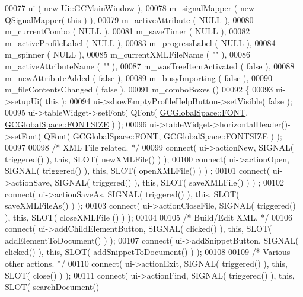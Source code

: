 \begin{DoxyCode}
00077   ui                        ( new Ui::\hyperlink{class_g_c_main_window}{GCMainWindow} ),
00078   m\_signalMapper            ( new QSignalMapper( this ) ),
00079   m\_activeAttribute         ( NULL ),
00080   m\_currentCombo            ( NULL ),
00081   m\_saveTimer               ( NULL ),
00082   m\_activeProfileLabel      ( NULL ),
00083   m\_progressLabel           ( NULL ),
00084   m\_spinner                 ( NULL ),
00085   m\_currentXMLFileName      ( \textcolor{stringliteral}{""} ),
00086   m\_activeAttributeName     ( \textcolor{stringliteral}{""} ),
00087   m\_wasTreeItemActivated    ( false ),
00088   m\_newAttributeAdded       ( false ),
00089   m\_busyImporting           ( false ),
00090   m\_fileContentsChanged     ( false ),
00091   m\_comboBoxes              ()
00092 \{
00093   ui->setupUi( \textcolor{keyword}{this} );
00094   ui->showEmptyProfileHelpButton->setVisible( \textcolor{keyword}{false} );
00095   ui->tableWidget->setFont( QFont( \hyperlink{namespace_g_c_global_space_a9d7158c8a1dfcc867d85ee6b9c5c4810}{GCGlobalSpace::FONT}, \hyperlink{namespace_g_c_global_space_ab9fa2f10bab070a4f59b7e3ef9166c86}{GCGlobalSpace::FONTSIZE}
       ) );
00096   ui->tableWidget->horizontalHeader()->setFont( QFont( \hyperlink{namespace_g_c_global_space_a9d7158c8a1dfcc867d85ee6b9c5c4810}{GCGlobalSpace::FONT}, 
      \hyperlink{namespace_g_c_global_space_ab9fa2f10bab070a4f59b7e3ef9166c86}{GCGlobalSpace::FONTSIZE} ) );
00097 
00098   \textcolor{comment}{/* XML File related. */}
00099   connect( ui->actionNew, SIGNAL( triggered() ), \textcolor{keyword}{this}, SLOT( newXMLFile() ) );
00100   connect( ui->actionOpen, SIGNAL( triggered() ), \textcolor{keyword}{this}, SLOT( openXMLFile() ) )
      ;
00101   connect( ui->actionSave, SIGNAL( triggered() ), \textcolor{keyword}{this}, SLOT( saveXMLFile() ) )
      ;
00102   connect( ui->actionSaveAs, SIGNAL( triggered() ), \textcolor{keyword}{this}, SLOT( saveXMLFileAs()
       ) );
00103   connect( ui->actionCloseFile, SIGNAL( triggered() ), \textcolor{keyword}{this}, SLOT( closeXMLFile
      () ) );
00104 
00105   \textcolor{comment}{/* Build/Edit XML. */}
00106   connect( ui->addChildElementButton, SIGNAL( clicked() ), \textcolor{keyword}{this}, SLOT( 
      addElementToDocument() ) );
00107   connect( ui->addSnippetButton, SIGNAL( clicked() ), \textcolor{keyword}{this}, SLOT( 
      addSnippetToDocument() ) );
00108 
00109   \textcolor{comment}{/* Various other actions. */}
00110   connect( ui->actionExit, SIGNAL( triggered() ), \textcolor{keyword}{this}, SLOT( close() ) );
00111   connect( ui->actionFind, SIGNAL( triggered() ), \textcolor{keyword}{this}, SLOT( searchDocument() 

\end{DoxyCode}

